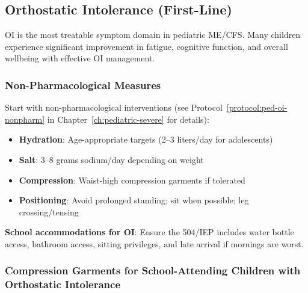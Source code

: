 \subsection{Orthostatic Intolerance (First-Line)}
\label{subsec:ped-ambulatory-oi}

OI is the most treatable symptom domain in pediatric ME/CFS. Many children experience significant improvement in fatigue, cognitive function, and overall wellbeing with effective OI management.

\subsubsection{Non-Pharmacological Measures}

Start with non-pharmacological interventions (see Protocol~\ref{protocol:ped-oi-nonpharm} in Chapter~\ref{ch:pediatric-severe} for details):

\begin{itemize}
    \item \textbf{Hydration}: Age-appropriate targets (2--3 liters/day for adolescents)
    \item \textbf{Salt}: 3--8 grams sodium/day depending on weight
    \item \textbf{Compression}: Waist-high compression garments if tolerated
    \item \textbf{Positioning}: Avoid prolonged standing; sit when possible; leg crossing/tensing
\end{itemize}

\textbf{School accommodations for OI}: Ensure the 504/IEP includes water bottle access, bathroom access, sitting privileges, and late arrival if mornings are worst.

\subsubsection{Compression Garments for School-Attending Children with Orthostatic Intolerance}

